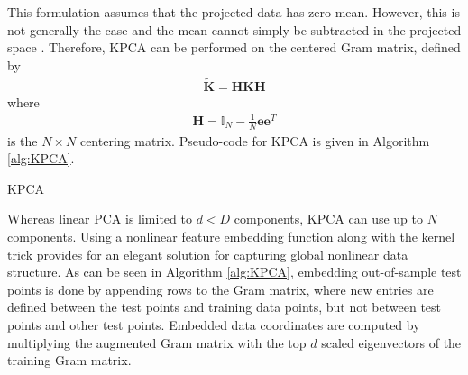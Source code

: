 \noindent
This formulation assumes that the projected data has zero mean.  However, this is not generally the case and the mean cannot simply be subtracted in the projected space \citep{Murphy2012}.  Therefore, KPCA can be performed on the centered Gram matrix, defined by
\begin{align}
	\tilde{\bm{K}} = \bm{H}\bm{K}\bm{H}
\end{align}
\noindent
where
\begin{align}
	\bm{H}= \mathbb{I}_{N} - \frac{1}{N}\bm{e}\bm{e}^{T}
\end{align}
\noindent
is the $N \times N$ centering matrix.  Pseudo-code for KPCA is given in Algorithm \ref{alg:KPCA}.


\begin{algorithm}[h!]
	\caption{KPCA}
	\label{alg:KPCA}
	\begin{algorithmic}[1]
		\EndFor
	\end{algorithmic}
\end{algorithm}
\noindent

Whereas linear PCA is limited to $d<D$ components, KPCA can use up to $N$ components.  Using a nonlinear feature embedding function along with the kernel trick provides for an elegant solution for capturing global nonlinear data structure.  As can be seen in Algorithm \ref{alg:KPCA}, embedding out-of-sample test points is done by appending rows to the Gram matrix, where new entries are defined between the test points and training data points, but not between test points and other test points.  Embedded data coordinates are computed by multiplying the augmented Gram matrix with the top $d$ scaled eigenvectors of the training Gram matrix.



